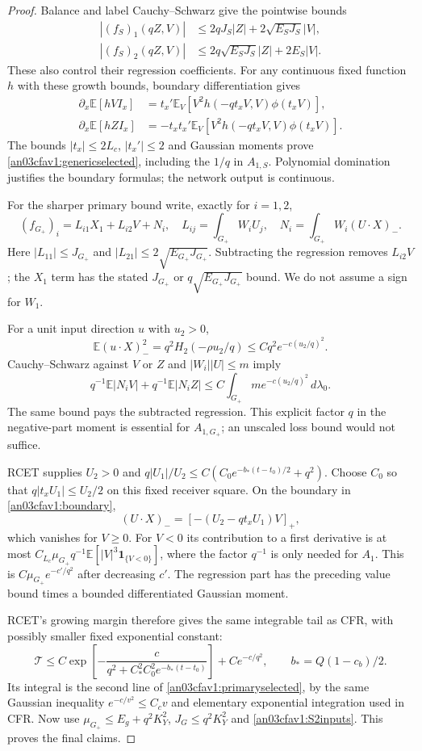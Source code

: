 \documentclass[11pt]{article}
\theoremstyle{remark}\newtheorem{remark}[theorem]{Remark}
\newcommand{\E}{\mathbb E}
\newcommand{\dd}{\,d}
\newcommand{\Gp}{G_+}
\newcommand{\one}{\mathbf1}
\begin{document}
\begin{proof}
Balance and label Cauchy--Schwarz give the pointwise bounds
\begin{align*}
 |(f_S)_1(qZ,V)|&\le2qJ_S|Z|+2\sqrt{E_SJ_S}|V|,\\
 |(f_S)_2(qZ,V)|&\le2q\sqrt{E_SJ_S}|Z|+2E_S|V|.
\end{align*}
These also control their regression coefficients. For any
continuous fixed function $h$ with these growth bounds,
boundary differentiation gives
\begin{align}
 \partial_x\E[hVI_x]
 &=t_x'\E_V[V^2h(-qt_xV,V)\phi(t_xV)],\nonumber\\
 \partial_x\E[hZI_x]
 &=-t_xt_x'\E_V[V^2h(-qt_xV,V)\phi(t_xV)].
 \label{an03cfav1:boundary}
\end{align}
The bounds $|t_x|\le2L_c$, $|t_x'|\le2$ and Gaussian moments
prove \eqref{an03cfav1:genericselected}, including the
$1/q$ in $A_{1,S}$. Polynomial domination justifies the
boundary formulas; the network output is continuous.

For the sharper primary bound write, exactly for $i=1,2$,
\[
 (f_{\Gp})_i=L_{i1}X_1+L_{i2}V+N_i,\quad
 L_{ij}=\int_{\Gp}W_iU_j,\quad
 N_i=\int_{\Gp}W_i(U\cdot X)_-.
\]
Here $|L_{11}|\le J_{\Gp}$ and
$|L_{21}|\le2\sqrt{E_{\Gp}J_{\Gp}}$.
Subtracting the regression removes $L_{i2}V$; the $X_1$
term has the stated $J_{\Gp}$ or $q\sqrt{E_{\Gp}J_{\Gp}}$
bound. We do not assume a sign for $W_1$.

For a unit input direction $u$ with $u_2>0$,
\[
 \E(u\cdot X)_-^2=q^2H_2(-\rho u_2/q)
       \le Cq^2e^{-c(u_2/q)^2}.
\]
Cauchy--Schwarz against $V$ or $Z$ and
$|W_i||U|\le m$ imply
\begin{equation}
 q^{-1}\E|N_iV|+q^{-1}\E|N_iZ|
 \le C\int_{\Gp}m e^{-c(u_2/q)^2}\dd\lambda_0.
 \label{an03cfav1:negativevalue}
\end{equation}
The same bound pays the subtracted regression. This explicit
factor $q$ in the negative-part moment is essential for
$A_{1,\Gp}$; an unscaled loss bound would not suffice.

RCET supplies $U_2>0$ and
$q|U_1|/U_2\le C(C_0e^{-b_*(t-t_0)/2}+q^2)$.
Choose $C_0$ so that $q|t_xU_1|\le U_2/2$ on this fixed
receiver square. On the boundary in \eqref{an03cfav1:boundary},
\[
 (U\cdot X)_-=[-(U_2-qt_xU_1)V]_+,
\]
which vanishes for $V\ge0$. For $V<0$ its contribution
to a first derivative is at most
$C_{L_c}\mu_{\Gp}q^{-1}\E[|V|^3\one_{\{V<0\}}]$,
where the factor $q^{-1}$ is only needed for $A_1$.
This is $C\mu_{\Gp}e^{-c'/q^2}$ after decreasing $c'$.
The regression part has the preceding value bound times
a bounded differentiated Gaussian moment.

RCET's growing margin therefore gives the same integrable
tail as CFR, with possibly smaller fixed exponential constant:
\[
 \mathcal T\le C\exp\!\left[
  -\frac{c}{q^2+C_*^2C_0^2e^{-b_*(t-t_0)}}\right]
                +Ce^{-c/q^2},\qquad b_*=Q(1-c_b)/2.
\]
Its integral is the second line of
\eqref{an03cfav1:primaryselected}, by the same Gaussian
inequality $e^{-c/v^2}\le C_cv$ and elementary exponential
integration used in CFR. Now use
$\mu_{\Gp}\le E_g+q^2K_Y^2$, $J_G\le q^2K_Y^2$ and
\eqref{an03cfav1:S2inputs}. This proves the final claims.
\end{proof}
\end{document}
